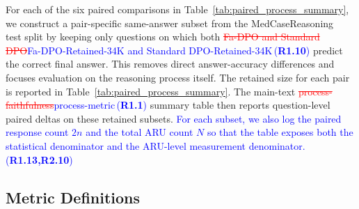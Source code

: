 \documentclass[a4paper,fleqn,doubleblind]{cas-sc}
\DeclareRobustCommand{\deleted}[1]{\textcolor{red}{\sout{#1}}}
\DeclareRobustCommand{\added}[1]{\textcolor{blue}{#1}}
\DeclareRobustCommand{\revtag}[1]{\textcolor{blue}{\scriptsize\,(\textbf{#1})}}
\begin{document}
For each of the six paired comparisons in Table~\ref{tab:paired_process_summary}, we construct a pair-specific same-answer subset from the MedCaseReasoning~\cite{wu2025medcasereasoning} test split by keeping only questions on which both \deleted{Fa-DPO and Standard DPO}\added{Fa-DPO-Retained-34K and Standard DPO-Retained-34K}\revtag{R1.10} predict the correct final answer. This removes direct answer-accuracy differences and focuses evaluation on the reasoning process itself. The retained size for each pair is reported in Table~\ref{tab:paired_process_summary}. The main-text \deleted{process-faithfulness}\added{process-metric}\revtag{R1.1} summary table then reports question-level paired deltas on these retained subsets. \added{For each subset, we also log the paired response count $2n$ and the total ARU count $N$ so that the table exposes both the statistical denominator and the ARU-level measurement denominator.}\revtag{R1.13,R2.10}

\subsection{Metric Definitions}
\end{document}
